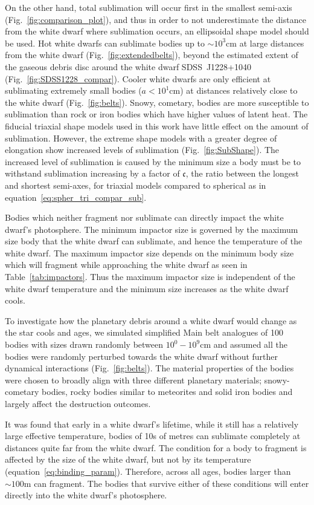 \documentclass[fleqn,usenatbib]{mnras}
\begin{document}
On the other hand, total sublimation will occur first in the smallest semi-axis (Fig.~\ref{fig:comparison_plot}), and thus in order to not underestimate the distance from the white dwarf where sublimation occurs, an ellipsoidal shape model should be used.
Hot white dwarfs can sublimate bodies up to $\sim 10^3$cm at large distances from the white dwarf (Fig.~\ref{fig:extendedbelts}), beyond the estimated extent of the gaseous debris disc around the white dwarf SDSS~J1228+1040 (Fig.~\ref{fig:SDSS1228_compar}). 
Cooler white dwarfs are only efficient at sublimating extremely small bodies ($a < 10^1$cm) at distances relatively close to the white dwarf (Fig.~\ref{fig:belts}). 
Snowy, cometary, bodies are more susceptible to sublimation than rock or iron bodies which have higher values of latent heat. 
The fiducial triaxial shape models used in this work have little effect on the amount of sublimation. 
However, the extreme shape models with a greater degree of elongation show increased levels of sublimation (Fig.~\ref{fig:SubShape}).
The increased level of sublimation is caused by the minimum size a body must be to withstand sublimation increasing by a factor of $\mathfrak{c}$, the ratio between the longest and shortest semi-axes, for triaxial models compared to spherical as in equation~\ref{eq:spher_tri_compar_sub}.

Bodies which neither fragment nor sublimate can directly impact the white dwarf's photosphere. 
The minimum impactor size is governed by the maximum size body that the white dwarf can sublimate, and hence the temperature of the white dwarf. 
The maximum impactor size depends on the minimum body size which will fragment while approaching the white dwarf as seen in Table~\ref{tab:impactors}. 
Thus the maximum impactor size is independent of the white dwarf temperature and the minimum size increases as the white dwarf cools. 

To investigate how the planetary debris around a white dwarf would change as the star cools and ages, we simulated simplified Main belt analogues of 100 bodies with sizes drawn randomly between $10^0 - 10^9$cm and assumed all the bodies were randomly perturbed towards the white dwarf without further dynamical interactions (Fig.~\ref{fig:belts}). 
The material properties of the bodies were chosen to broadly align with three different planetary materials; snowy-cometary bodies, rocky bodies similar to meteorites and solid iron bodies and largely affect the destruction outcomes.

It was found that early in a white dwarf's lifetime, while it still has a relatively large effective temperature, bodies of 10s of metres can sublimate completely at distances quite far from the white dwarf.  
The condition for a body to fragment is affected by the size of the white dwarf, but not by its temperature (equation~\ref{eq:binding_param}). 
Therefore, across all ages, bodies larger than $\sim 100$m can fragment. 
The bodies that survive either of these conditions will enter directly into the white dwarf's photosphere.
\end{document}
